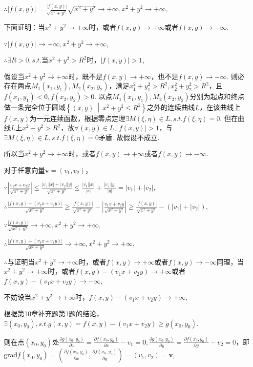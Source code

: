 \documentclass[12pt,UTF8]{ctexart}
\newcommand\Set[2]{\left\{#1\ \middle\vert\ #2 \right\}}
\begin{document}
\begin{enumerate}
$\therefore|f(x,y)|=\frac{|f(x,y)|}{\sqrt{x^2+y^2}}\sqrt{x^2+y^2}\rightarrow+\infty,x^2+y^2\rightarrow+\infty$,

下面证明：当$x^2+y^2\rightarrow+\infty$时，或者$f(x,y)\rightarrow+\infty$或者$f(x,y)\rightarrow-\infty$.

$\because|f(x,y)|\rightarrow+\infty,x^2+y^2\rightarrow+\infty$,

$\therefore\exists R>0,s.t.$当$x^2+y^2>R^2$时，$|f(x,y)|>1$,

假设当$x^2+y^2\rightarrow+\infty$时，既不是$f(x,y)\rightarrow+\infty$，也不是$f(x,y)\rightarrow-\infty$. 则必存在两点$M_1(x_1,y_1),M_2(x_2,y_2)$，满足$x_1^2+y_1^2>R^2,x_2^2+y_2^2>R^2$，且$f(x_1,y_1)<0,f(x_2,y_2)>0$. 以点$M_1(x_1,y_1),M_2(x_2,y_2)$分别为起点和终点做一条完全位于圆域$\Set{(x,y)}{x^2+y^2\leq R^2}$之外的连续曲线$L$，在该曲线上$f(x,y)$为一元连续函数，根据零点定理$\exists M(\xi,\eta)\in L,s.t.f(\xi,\eta)=0$. 但在曲线$L$上$x^2+y^2>R^2$，故$\forall(x,y)\in L,|f(x,y)|>1$，与$\exists M(\xi,\eta)\in L,s.t.f(\xi,\eta)=0$矛盾. 故假设不成立. 

所以当$x^2+y^2\rightarrow+\infty$时，或者$f(x,y)\rightarrow+\infty$或者$f(x,y)\rightarrow-\infty$.

对于任意向量$\bm v=(v_1,v_2)$，

$\because|\frac{v_1x+v_2y}{\sqrt{x^2+y^2}}|\leq\frac{|v_1||x|+|v_2||y|}{\sqrt{x^2+y^2}}\leq\frac{|v_1||x|}{|x|}+\frac{|v_1||y|}{|y|}=|v_1|+|v_2|$,

$\therefore\frac{|f(x,y)-(v_1x+v_2y)|}{\sqrt{x^2+y^2}}\geq\frac{|f(x,y)|}{\sqrt{x^2+y^2}}-|\frac{v_1x+v_2y}{\sqrt{x^2+y^2}}|\geq\frac{|f(x,y)|}{\sqrt{x^2+y^2}}-(|v_1|+|v_2|)$,

$\because\frac{|f(x,y)|}{\sqrt{x^2+y^2}}\rightarrow+\infty,x^2+y^2\rightarrow+\infty$,

$\therefore\frac{|f(x,y)-(v_1x+v_2y)|}{\sqrt{x^2+y^2}}\rightarrow+\infty,x^2+y^2\rightarrow+\infty$,

$\therefore$与证明当$x^2+y^2\rightarrow+\infty$时，或者$f(x,y)\rightarrow+\infty$或者$f(x,y)\rightarrow-\infty$同理，当$x^2+y^2\rightarrow+\infty$时，或者$f(x,y)-(v_1x+v_2y)\rightarrow+\infty$或者$f(x,y)-(v_1x+v_2y)\rightarrow-\infty$,

不妨设当$x^2+y^2\rightarrow+\infty$时，$f(x,y)-(v_1x+v_2y)\rightarrow+\infty$,

根据第10章补充题第1题的结论，$\exists(x_0,y_0),s.t.g(x,y)=f(x,y)-(v_1x+v_2y)\geq g(x_0,y_0)$. 

则在点$(x_0,y_0)$处$\frac{\partial g(x_0,y_0)}{\partial x}=\frac{\partial f(x_0,y_0)}{\partial x}-v_1=0,\frac{\partial g(x_0,y_0)}{\partial y}=\frac{\partial f(x_0,y_0)}{\partial y}-v_2=0$，即$\mathrm{grad}f(x_0,y_0)=(\frac{\partial f(x_0,y_0)}{\partial x},\frac{\partial f(x_0,y_0)}{\partial y})=(v_1,v_2)=\bm v$,


\end{enumerate}
\end{document}
